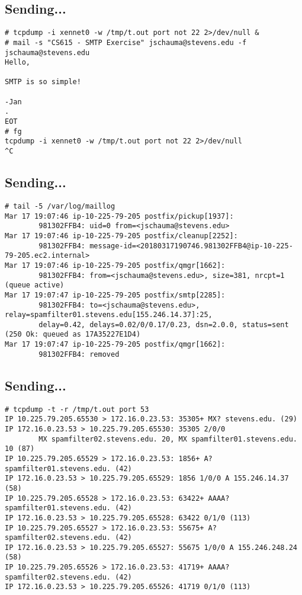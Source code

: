 \documentclass[xga]{xdvislides}
\begin{document}
\subsection{Sending...}
\begin{verbatim}
# tcpdump -i xennet0 -w /tmp/t.out port not 22 2>/dev/null &
# mail -s "CS615 - SMTP Exercise" jschauma@stevens.edu -f jschauma@stevens.edu
Hello,

SMTP is so simple!

-Jan
.
EOT
# fg
tcpdump -i xennet0 -w /tmp/t.out port not 22 2>/dev/null
^C
\end{verbatim}


\subsection{Sending...}
\begin{verbatim}
# tail -5 /var/log/maillog
Mar 17 19:07:46 ip-10-225-79-205 postfix/pickup[1937]:
        981302FFB4: uid=0 from=<jschauma@stevens.edu>
Mar 17 19:07:46 ip-10-225-79-205 postfix/cleanup[2252]:
        981302FFB4: message-id=<20180317190746.981302FFB4@ip-10-225-79-205.ec2.internal>
Mar 17 19:07:46 ip-10-225-79-205 postfix/qmgr[1662]:
        981302FFB4: from=<jschauma@stevens.edu>, size=381, nrcpt=1 (queue active)
Mar 17 19:07:47 ip-10-225-79-205 postfix/smtp[2285]:
        981302FFB4: to=<jschauma@stevens.edu>, relay=spamfilter01.stevens.edu[155.246.14.37]:25,
        delay=0.42, delays=0.02/0/0.17/0.23, dsn=2.0.0, status=sent (250 Ok: queued as 17A35227E1D4)
Mar 17 19:07:47 ip-10-225-79-205 postfix/qmgr[1662]:
        981302FFB4: removed
\end{verbatim}

\subsection{Sending...}
\begin{verbatim}
# tcpdump -t -r /tmp/t.out port 53
IP 10.225.79.205.65530 > 172.16.0.23.53: 35305+ MX? stevens.edu. (29)
IP 172.16.0.23.53 > 10.225.79.205.65530: 35305 2/0/0
        MX spamfilter02.stevens.edu. 20, MX spamfilter01.stevens.edu. 10 (87)
IP 10.225.79.205.65529 > 172.16.0.23.53: 1856+ A? spamfilter01.stevens.edu. (42)
IP 172.16.0.23.53 > 10.225.79.205.65529: 1856 1/0/0 A 155.246.14.37 (58)
IP 10.225.79.205.65528 > 172.16.0.23.53: 63422+ AAAA? spamfilter01.stevens.edu. (42)
IP 172.16.0.23.53 > 10.225.79.205.65528: 63422 0/1/0 (113)
IP 10.225.79.205.65527 > 172.16.0.23.53: 55675+ A? spamfilter02.stevens.edu. (42)
IP 172.16.0.23.53 > 10.225.79.205.65527: 55675 1/0/0 A 155.246.248.24 (58)
IP 10.225.79.205.65526 > 172.16.0.23.53: 41719+ AAAA? spamfilter02.stevens.edu. (42)
IP 172.16.0.23.53 > 10.225.79.205.65526: 41719 0/1/0 (113)
\end{verbatim}
\end{document}
